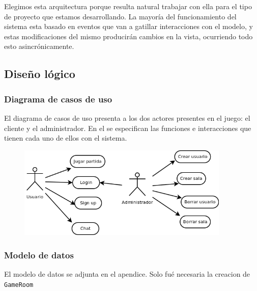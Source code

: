 \documentclass[a4paper,11pt]{article}
\begin{document}
Elegimos esta arquitectura porque resulta natural trabajar con ella 
para el tipo de proyecto que estamos desarrollando. La mayoría del 
funcionamiento del sistema esta basado en eventos que van a gatillar 
interacciones con el modelo, y estas modificaciones del mismo producirán 
cambios en la vista, ocurriendo todo esto asincrónicamente.
\newpage
\subsection{Diseño lógico}
\subsubsection{Diagrama de casos de uso}
	El diagrama de casos de uso presenta a los dos actores presentes en
el juego: el cliente y el administrador. En el se especifican las funciones e
interacciones que tienen cada uno de ellos con el sistema.
\begin{figure}[h!]
	\centering
	\includegraphics[width=0.9\textwidth]{diag_casos_uso.png}
\end{figure}

\subsubsection{Modelo de datos}
El modelo de datos se adjunta en el apendice. Solo fué necesaria la creacion de \texttt{GameRoom}

\newpage
\end{document}
